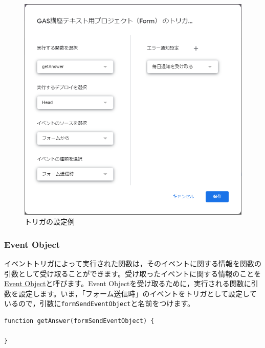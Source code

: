 \documentclass[uplatex,a4j]{jsarticle}
\begin{document}
\begin{figure}[H]
 \centering
 \includegraphics[keepaspectratio, scale=0.7]{images/trigger_edit.png}
 \caption{トリガの設定例}
 \label{fig:trigger_edit}
\end{figure}

\subsubsection{Event Object}

イベントトリガによって実行された関数は，そのイベントに関する情報を関数の引数として受け取ることができます。受け取ったイベントに関する情報のことを\href{https://developers.google.com/apps-script/guides/triggers/events?hl=en}{Event Object}と呼びます。Event Objectを受け取るために，実行される関数に引数を設定します。いま，「フォーム送信時」のイベントをトリガとして設定しているので，引数に\verb|formSendEventObject|と名前をつけます。

\begin{lstlisting}[basicstyle=\ttfamily\footnotesize,frame=single,caption=Event Object sample 1]
function getAnswer(formSendEventObject) {
  
}
\end{lstlisting}
\end{document}

